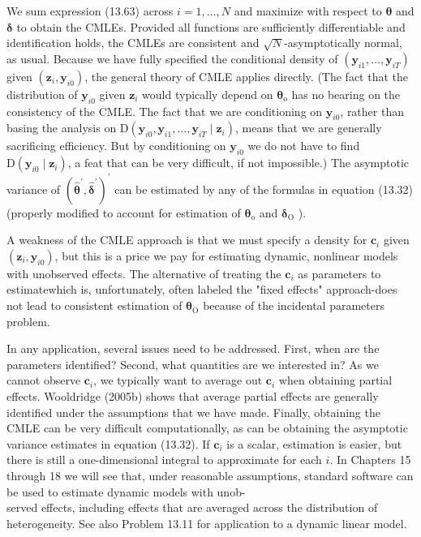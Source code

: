 \documentclass[10pt]{article}
\begin{document}
We sum expression (13.63) across $i=1, \ldots, N$ and maximize with respect to $\boldsymbol{\theta}$ and $\boldsymbol{\delta}$ to obtain the CMLEs. Provided all functions are sufficiently differentiable and identification holds, the CMLEs are consistent and $\sqrt{N}$-asymptotically normal, as usual. Because we have fully specified the conditional density of $\left(\mathbf{y}_{i 1}, \ldots, \mathbf{y}_{i T}\right)$ given $\left(\mathbf{z}_{i}, \mathbf{y}_{i 0}\right)$, the general theory of CMLE applies directly. (The fact that the distribution of $\mathbf{y}_{i 0}$ given $\mathbf{z}_{i}$ would typically depend on $\boldsymbol{\theta}_{\mathrm{o}}$ has no bearing on the consistency of the CMLE. The fact that we are conditioning on $\mathbf{y}_{i 0}$, rather than basing the analysis on $\mathrm{D}\left(\mathbf{y}_{i 0}, \mathbf{y}_{i 1}, \ldots, \mathbf{y}_{i T} \mid \mathbf{z}_{i}\right)$, means that we are generally sacrificing efficiency. But by conditioning on $\mathbf{y}_{i 0}$ we do not have to find $\mathrm{D}\left(\mathbf{y}_{i 0} \mid \mathbf{z}_{i}\right)$, a feat that can be very difficult, if not impossible.) The asymptotic variance of $\left(\hat{\boldsymbol{\theta}}^{\prime}, \hat{\boldsymbol{\delta}}^{\prime}\right)^{\prime}$ can be estimated by any of the formulas in equation (13.32) (properly modified to account for estimation of $\boldsymbol{\theta}_{\mathrm{o}}$ and $\boldsymbol{\delta}_{\mathrm{O}}$ ).

A weakness of the CMLE approach is that we must specify a density for $\mathbf{c}_{i}$ given $\left(\mathbf{z}_{i}, \mathbf{y}_{i 0}\right)$, but this is a price we pay for estimating dynamic, nonlinear models with unobserved effects. The alternative of treating the $\mathbf{c}_{i}$ as parameters to estimatewhich is, unfortunately, often labeled the "fixed effects" approach-does not lead to consistent estimation of $\boldsymbol{\theta}_{\mathrm{O}}$ because of the incidental parameters problem.

In any application, several issues need to be addressed. First, when are the parameters identified? Second, what quantities are we interested in? As we cannot observe $\mathbf{c}_{i}$, we typically want to average out $\mathbf{c}_{i}$ when obtaining partial effects. Wooldridge (2005b) shows that average partial effects are generally identified under the assumptions that we have made. Finally, obtaining the CMLE can be very difficult computationally, as can be obtaining the asymptotic variance estimates in equation (13.32). If $\mathbf{c}_{i}$ is a scalar, estimation is easier, but there is still a one-dimensional integral to approximate for each $i$. In Chapters 15 through 18 we will see that, under reasonable assumptions, standard software can be used to estimate dynamic models with unob-\\
served effects, including effects that are averaged across the distribution of heterogeneity. See also Problem 13.11 for application to a dynamic linear model.
\end{document}
